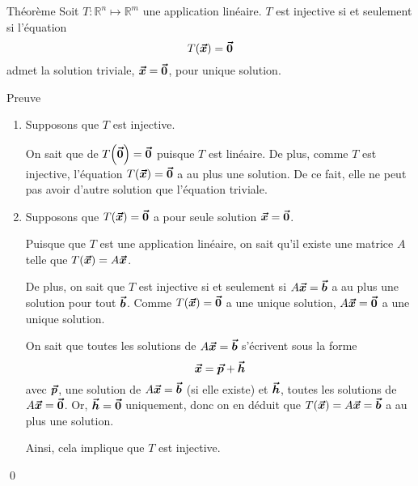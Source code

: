 \documentclass[a4paper]{article}
\begin{document}
\begin{parag}{Théorème}
    Soit $T: \mathbb{R}^{n} \mapsto \mathbb{R}^{m}$ une application linéaire. $T$ est injective si et seulement si l'équation
    \[T\left(\bvec{x}\right) = \bvec{0}\]
    admet la solution triviale, $\bm{\protect\vec{x}} = \bm{\protect\vec{0}}$, pour unique solution.

    \begin{subparag}{Preuve}
        \begin{enumerate}[left=0pt]
            \item Supposons que $T$ est injective.

                On sait que de $T\left(\bvec{0}\right) = \bvec{0}$ puisque $T$ est linéaire. De plus, comme $T$ est injective, l'équation $T\left(\bvec{x}\right) = \bvec{0}$ a au plus une solution. De ce fait, elle ne peut pas avoir d'autre solution que l'équation triviale.

            \vspace{1em}

            \item Supposons que $T\left(\bvec{x}\right) = \bvec{0}$ a pour seule solution $\bm{\protect\vec{x}} = \bm{\protect\vec{0}}$.

                Puisque que $T$ est une application linéaire, on sait qu'il existe une matrice $A$ telle que $T\left(\bvec{x}\right) = A \bvec{x}$.

               De plus, on sait que $T$ est injective si et seulement si $A \bm{\protect\vec{x}} = \bm{\protect\vec{b}}$ a au plus une solution pour tout $\bm{\protect\vec{b}}$. Comme $T\left(\bvec{x}\right) = \bvec{0}$ a une unique solution, $A \bm{\protect\vec{x}} = \bm{\protect\vec{0}}$ a une unique solution.

               On sait que toutes les solutions de $A \bm{\protect\vec{x}} = \bm{\protect\vec{b}}$ s'écrivent sous la forme
               \[\bm{\protect\vec{x}} = \bm{\protect\vec{p}} + \bm{\protect\vec{h}}\]
               avec $\bm{\protect\vec{p}}$, une solution de $A \bm{\protect\vec{x}} = \bm{\protect\vec{b}}$ (si elle existe) et $\bm{\protect\vec{h}}$, toutes les solutions de $A \bm{\protect\vec{x}} = \bm{\protect\vec{0}}$. Or, $\bm{\protect\vec{h}} = \bm{\protect\vec{0}}$ uniquement, donc on en déduit que $T\left(\bvec{x}\right) = A \bvec{x} = \bvec{b}$ a au plus une solution.

               Ainsi, cela implique que $T$ est injective.
        \end{enumerate}

        \qed
    \end{subparag}
\end{parag}
\end{document}
